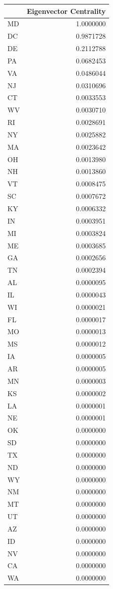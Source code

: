 \documentclass[
  a4paper,
]{article}
\begin{document}
\begin{longtable}[]{@{}lr@{}}
\toprule\noalign{}
& Eigenvector Centrality \\
\midrule\noalign{}
\endhead
\bottomrule\noalign{}
\endlastfoot
MD & 1.0000000 \\
DC & 0.9871728 \\
DE & 0.2112788 \\
PA & 0.0682453 \\
VA & 0.0486044 \\
NJ & 0.0310696 \\
CT & 0.0033553 \\
WV & 0.0030710 \\
RI & 0.0028691 \\
NY & 0.0025882 \\
MA & 0.0023642 \\
OH & 0.0013980 \\
NH & 0.0013860 \\
VT & 0.0008475 \\
SC & 0.0007672 \\
KY & 0.0006332 \\
IN & 0.0003951 \\
MI & 0.0003824 \\
ME & 0.0003685 \\
GA & 0.0002656 \\
TN & 0.0002394 \\
AL & 0.0000095 \\
IL & 0.0000043 \\
WI & 0.0000021 \\
FL & 0.0000017 \\
MO & 0.0000013 \\
MS & 0.0000012 \\
IA & 0.0000005 \\
AR & 0.0000005 \\
MN & 0.0000003 \\
KS & 0.0000002 \\
LA & 0.0000001 \\
NE & 0.0000001 \\
OK & 0.0000000 \\
SD & 0.0000000 \\
TX & 0.0000000 \\
ND & 0.0000000 \\
WY & 0.0000000 \\
NM & 0.0000000 \\
MT & 0.0000000 \\
UT & 0.0000000 \\
AZ & 0.0000000 \\
ID & 0.0000000 \\
NV & 0.0000000 \\
CA & 0.0000000 \\
WA & 0.0000000 \\
\end{longtable}
\end{document}
